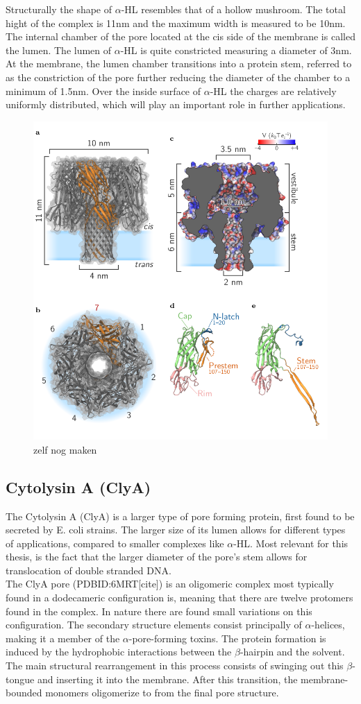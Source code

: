 Structurally the shape of $\alpha$-HL resembles that of a hollow mushroom. The total
hight of the complex is 11nm and the maximum width is measured to be 10nm. The internal
chamber of the pore located at the cis side of the membrane is called the lumen.
The lumen of $\alpha$-HL is quite constricted measuring a diameter of 3nm. At the
membrane, the lumen chamber transitions into a protein stem, referred to as the
constriction of the pore further reducing the diameter of the chamber to a minimum of
1.5nm. Over the inside surface of  $\alpha$-HL the charges are relatively uniformly
distributed, which will play an important role in further applications.\\

\begin{figure}[h!]
  \centering
  \includegraphics[width=0.5\linewidth]{Figures/alpha-hemolysin.png}
  \caption{zelf nog maken}
  \label{adsf}
\end{figure}


\subsection{Cytolysin A (ClyA)}

The Cytolysin A (ClyA) is a larger type of pore forming protein, first found to be
secreted by E. coli strains. The larger size of its lumen allows for different types of
applications, compared to smaller complexes like $\alpha$-HL. Most relevant for this
thesis, is the fact that the larger diameter of the pore's stem allows for translocation
of double stranded DNA.\\

The ClyA pore (PDBID:6MRT[cite]) is an oligomeric complex most typically found in a
 dodecameric configuration is, meaning that there are twelve protomers found in the
complex. In nature there are found small variations on this configuration. The secondary
structure elements consist principally of $\alpha$-helices, making it a member of the $
\alpha$-pore-forming toxins. The protein formation is induced by the hydrophobic
interactions between the $\beta$-hairpin and the solvent. The main structural
rearrangement in this process consists of swinging
out this $\beta$-tongue and inserting it into the membrane. After this transition, the
membrane-bounded monomers oligomerize to from the final pore structure.

